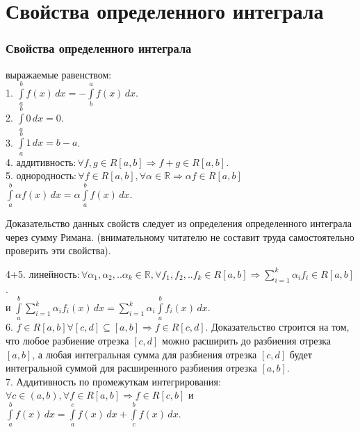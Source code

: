\part{Свойства определенного интеграла}
\section{Свойства определенного интеграла}

\begin{prop} выражаемые равенством: \\
    1. $ \int\limits_a^b f(x) \, dx = -\int\limits_b^a f(x) \, dx $. \\
    2. $ \int\limits_a^b 0 \, dx = 0 $. \\ 
    3. $ \int\limits_a^b 1 \, dx = b - a $. \\ 
    4. $ \text{аддитивность}: \forall f, g \in R[a, b] \Rightarrow f + g \in R[a, b] $. \\
    5. $ \text{однородность}: \forall f \in R[a, b], \forall \alpha \in \mathbb{R} \Rightarrow \alpha f \in R[a, b] $  
    $ \int\limits_a^b \alpha f(x) \, dx = \alpha \int\limits_a^b f(x) \, dx $.
\end{prop}

Доказательство данных свойств следует из определения определенного интеграла через сумму Римана.
(внимательному читателю не составит труда самостоятельно проверить эти свойства).

\begin{prop}
4+5. $ \text{линейность}: \forall \alpha_1, \alpha_2, ..\alpha_k \in \mathbb{R}, \forall f_1, f_2, ..f_k \in R[a, b] \Rightarrow \sum\limits_{i=1}^k \alpha_i f_i \in R[a, b] $. \\
    и $ \int\limits_a^b \sum\limits_{i=1}^k \alpha_i f_i(x) \, dx = \sum\limits_{i=1}^k \alpha_i \int\limits_a^b f_i(x) \, dx $. \\
6. $ f \in R[a,b] \forall [c,d] \subseteq [a,b] \Rightarrow f \in R[c,d] $. Доказательство строится на том, что любое разбиение отрезка $[c,d]$ можно расширить до разбиения отрезка $[a,b]$, а любая интегральная сумма для разбиения отрезка $[c,d]$ будет интегральной суммой для расширенного разбиения отрезка $[a,b]$. \\
7. Аддитивность по промежуткам интегрирования: $ \forall c \in (a, b), \forall f \in R[a, b] \Rightarrow f \in R[c, b] $ и $ \int\limits_a^b f(x) \, dx = \int\limits_a^c f(x) \, dx + \int\limits_c^b f(x) \, dx $.
\end{prop}

